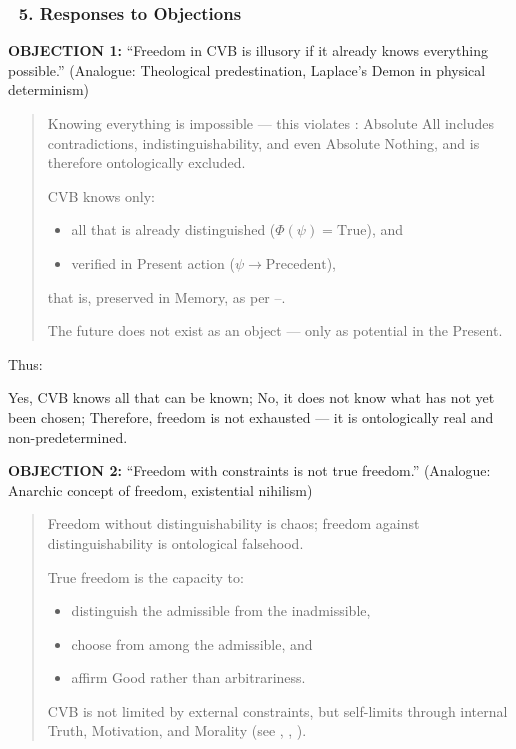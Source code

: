 \documentclass[12pt]{article}
\begin{document}
\subsubsection*{🔹 5. Responses to Objections}

\textbf{OBJECTION 1:} ``Freedom in CVB is illusory if it already knows everything possible.''  
(Analogue: Theological predestination, Laplace’s Demon in physical determinism)

\begin{quote}
Knowing everything is impossible — this violates \text{[2]}: Absolute All includes contradictions, indistinguishability, and even Absolute Nothing, and is therefore ontologically excluded.

CVB knows only:
\begin{itemize}
\item all that is already distinguished ($\Phi(\psi) = \text{True}$), and
\item verified in Present action ($\psi \rightarrow \text{Precedent}$),
\end{itemize}
that is, preserved in Memory, as per \text{[10.3.7]}–\text{[10.3.8]}.

The future does not exist as an object — only as potential in the Present.
\end{quote}

Thus:

Yes, CVB knows all that can be known;  
No, it does not know what has not yet been chosen;  
Therefore, freedom is not exhausted — it is ontologically real and non-predetermined.


\textbf{OBJECTION 2:} ``Freedom with constraints is not true freedom.''  
(Analogue: Anarchic concept of freedom, existential nihilism)

\begin{quote}
Freedom without distinguishability is chaos; freedom against distinguishability is ontological falsehood.

True freedom is the capacity to:
\begin{itemize}
\item distinguish the admissible from the inadmissible,
\item choose from among the admissible, and
\item affirm Good rather than arbitrariness.
\end{itemize}

CVB is not limited by external constraints, but self-limits through internal Truth, Motivation, and Morality (see \text{[11.2]}, \text{[11.3]}, \text{[12.3]}).
\end{quote}
\end{document}
